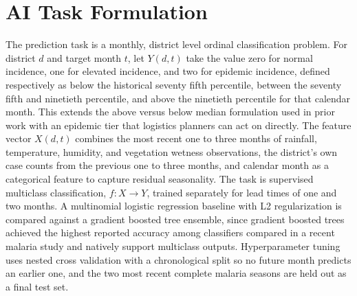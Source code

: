 \documentclass[11pt]{article}
\begin{document}
\section{AI Task Formulation}
The prediction task is a monthly, district level ordinal classification problem. For district $d$ and target month $t$, let $Y(d,t)$ take the value zero for normal incidence, one for elevated incidence, and two for epidemic incidence, defined respectively as below the historical seventy fifth percentile, between the seventy fifth and ninetieth percentile, and above the ninetieth percentile for that calendar month. This extends the above versus below median formulation used in prior work \cite{martineau2022} with an epidemic tier that logistics planners can act on directly. The feature vector $X(d,t)$ combines the most recent one to three months of rainfall, temperature, humidity, and vegetation wetness observations, the district's own case counts from the previous one to three months, and calendar month as a categorical feature to capture residual seasonality. The task is supervised multiclass classification, $f: X \rightarrow Y$, trained separately for lead times of one and two months. A multinomial logistic regression baseline with L2 regularization is compared against a gradient boosted tree ensemble, since gradient boosted trees achieved the highest reported accuracy among classifiers compared in a recent malaria study \cite{khan2024} and natively support multiclass outputs. Hyperparameter tuning uses nested cross validation with a chronological split so no future month predicts an earlier one, and the two most recent complete malaria seasons are held out as a final test set.
\end{document}
